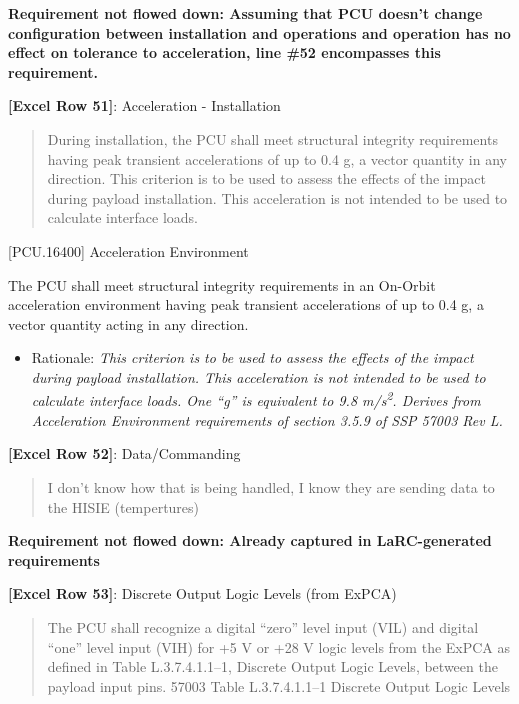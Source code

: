 \textbf{Requirement not flowed down: Assuming that PCU doesn't change configuration between installation and operations and operation has no effect on tolerance to acceleration, line \#52 encompasses this requirement.}

\textbf{[Excel Row 51]}: Acceleration - Installation

\begin{quote}
During installation, the PCU shall meet structural integrity requirements having peak transient accelerations of up to 0.4 g, a vector quantity in any direction. This criterion is to be used to assess the effects of the impact during payload installation. This acceleration is not intended to be used to calculate interface loads.
\end{quote}

[PCU.16400] Acceleration Environment

The PCU shall meet structural integrity requirements in an On-Orbit acceleration environment having peak transient accelerations of up to 0.4 g, a vector quantity acting in any direction.

\begin{itemize}
\item{} Rationale: \emph{This criterion is to be used to assess the effects of the impact during payload installation. This acceleration is not intended to be used to calculate interface loads. One ``g'' is equivalent to 9.8 m\slash s\textsuperscript{2}. Derives from Acceleration Environment requirements of section 3.5.9 of SSP 57003 Rev L.}

\end{itemize}

\textbf{[Excel Row 52]}: Data\slash Commanding

\begin{quote}
I don't know how that is being handled, I know they are sending data to the HISIE (tempertures)
\end{quote}

\textbf{Requirement not flowed down: Already captured in LaRC-generated requirements}

\textbf{[Excel Row 53]}: Discrete Output Logic Levels (from ExPCA)

\begin{quote}
The PCU shall recognize a digital “zero” level input (VIL) and digital “one” level input (VIH) for +5 V or +28 V logic levels from the ExPCA as defined in Table L.3.7.4.1.1--1, Discrete Output Logic Levels, between the payload input pins.
57003 Table L.3.7.4.1.1--1 Discrete Output Logic Levels
\end{quote}

